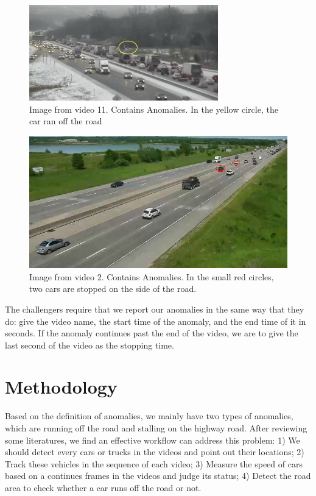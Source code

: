 \documentclass[10pt,twocolumn,letterpaper]{article}
\begin{document}
\begin{figure}  
    \includegraphics[width=8.2cm]{images/anomalyTrain11.png}
    \caption{Image from video 11. Contains Anomalies. In the yellow circle, the car ran off the road}
    \label{train11}
\end{figure}

\begin{figure}  
    \includegraphics[scale=.29]{images/anomalyTrain2_focus.png}
    \caption{Image from video 2. Contains Anomalies. In the small red circles, two cars are stopped on the side of the road.}
    \label{train2}
\end{figure}


The challengers require that we report our anomalies in the same way that they do: give the video name, the start time of the anomaly, and the end time of it in seconds. If the anomaly continues past the end of the video, we are to give the last second of the video as the stopping time.


\section{Methodology}

Based on the definition of anomalies, we mainly have two types of anomalies, which are running off the road and stalling on the highway road. After reviewing some literatures, we find an effective workflow can address this problem:
1) We should detect every cars or trucks in the videos and point out their locations; 2) Track these vehicles in the sequence of each video; 3) Measure the speed of cars based on a continues frames in the videos and judge its status; 4) Detect the road area to check whether a car runs off the road or not.
\end{document}
